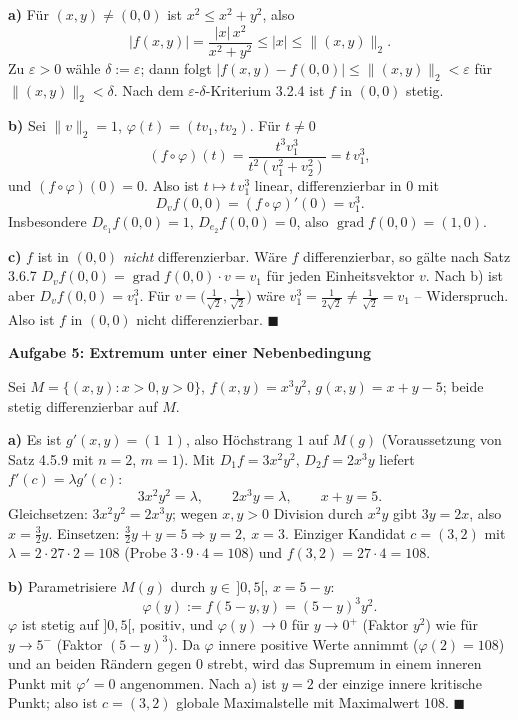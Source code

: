 \documentclass[a4paper,12pt]{article}
\providecommand{\qed}{\hfill\ensuremath{\blacksquare}}
\newcommand{\aufgabe}[2]{%
  \bigskip\par\noindent\textbf{Aufgabe #1: #2}\par\nobreak\medskip}
\begin{document}
\textbf{a)} Für $(x,y)\neq(0,0)$ ist $x^2\le x^2+y^2$, also
\[
|f(x,y)|=\frac{|x|\,x^2}{x^2+y^2}\le |x|\le \|(x,y)\|_2.
\]
Zu $\varepsilon>0$ wähle $\delta:=\varepsilon$; dann folgt $|f(x,y)-f(0,0)|\le\|(x,y)\|_2<\varepsilon$ für $\|(x,y)\|_2<\delta$. Nach dem $\varepsilon$-$\delta$-Kriterium 3.2.4 ist $f$ in $(0,0)$ stetig.

\textbf{b)} Sei $\|v\|_2=1$, $\varphi(t)=(tv_1,tv_2)$. Für $t\neq0$
\[
(f\circ\varphi)(t)=\frac{t^3v_1^3}{t^2(v_1^2+v_2^2)}=t\,v_1^3,
\]
und $(f\circ\varphi)(0)=0$. Also ist $t\mapsto t\,v_1^3$ linear, differenzierbar in $0$ mit
\[
D_v f(0,0)=(f\circ\varphi)'(0)=v_1^3.
\]
Insbesondere $D_{e_1}f(0,0)=1$, $D_{e_2}f(0,0)=0$, also $\operatorname{grad} f(0,0)=(1,0)$.

\textbf{c)} $f$ ist in $(0,0)$ \emph{nicht} differenzierbar. Wäre $f$ differenzierbar, so gälte nach Satz 3.6.7 $D_v f(0,0)=\operatorname{grad} f(0,0)\cdot v=v_1$ für jeden Einheitsvektor $v$. Nach b) ist aber $D_v f(0,0)=v_1^3$. Für $v=\bigl(\tfrac{1}{\sqrt2},\tfrac{1}{\sqrt2}\bigr)$ wäre $v_1^3=\tfrac{1}{2\sqrt2}\neq\tfrac{1}{\sqrt2}=v_1$ -- Widerspruch. Also ist $f$ in $(0,0)$ nicht differenzierbar. \qed

\aufgabe{5}{Extremum unter einer Nebenbedingung}

Sei $M=\{(x,y):x>0,y>0\}$, $f(x,y)=x^3y^2$, $g(x,y)=x+y-5$; beide stetig differenzierbar auf $M$.

\textbf{a)} Es ist $g'(x,y)=(1\ \ 1)$, also Höchstrang $1$ auf $M(g)$ (Voraussetzung von Satz 4.5.9 mit $n=2$, $m=1$). Mit $D_1f=3x^2y^2$, $D_2f=2x^3y$ liefert $f'(c)=\lambda g'(c)$:
\[
3x^2y^2=\lambda,\qquad 2x^3y=\lambda,\qquad x+y=5.
\]
Gleichsetzen: $3x^2y^2=2x^3y$; wegen $x,y>0$ Division durch $x^2y$ gibt $3y=2x$, also $x=\tfrac32 y$. Einsetzen: $\tfrac32 y+y=5\Rightarrow y=2,\ x=3$. Einziger Kandidat $c=(3,2)$ mit $\lambda=2\cdot27\cdot2=108$ (Probe $3\cdot9\cdot4=108$) und $f(3,2)=27\cdot4=108$.

\textbf{b)} Parametrisiere $M(g)$ durch $y\in\,]0,5[$, $x=5-y$:
\[
\varphi(y):=f(5-y,y)=(5-y)^3y^2.
\]
$\varphi$ ist stetig auf $]0,5[$, positiv, und $\varphi(y)\to0$ für $y\to0^+$ (Faktor $y^2$) wie für $y\to5^-$ (Faktor $(5-y)^3$). Da $\varphi$ innere positive Werte annimmt ($\varphi(2)=108$) und an beiden Rändern gegen $0$ strebt, wird das Supremum in einem inneren Punkt mit $\varphi'=0$ angenommen. Nach a) ist $y=2$ der einzige innere kritische Punkt; also ist $c=(3,2)$ globale Maximalstelle mit Maximalwert $108$. \qed
\end{document}
